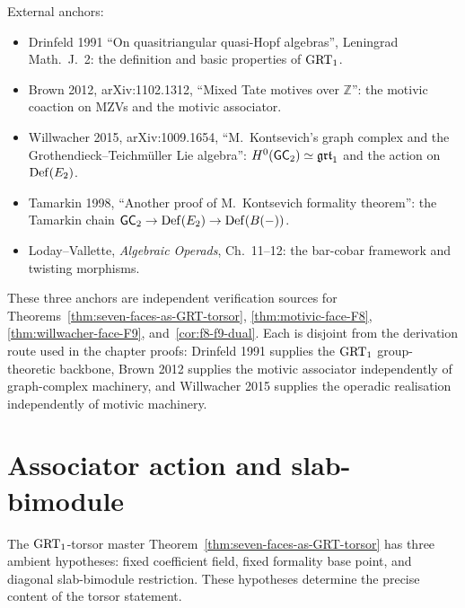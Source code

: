 External anchors:
\begin{itemize}
\item Drinfeld 1991 ``On quasitriangular quasi-Hopf algebras'',
Leningrad Math.~J.~2: the definition and basic properties of
$\mathrm{GRT}_1$.
\item Brown 2012, arXiv:1102.1312, ``Mixed Tate motives over
$\mathbb{Z}$'': the motivic coaction on MZVs and the motivic
associator.
\item Willwacher 2015, arXiv:1009.1654, ``M.~Kontsevich's graph
complex and the Grothendieck--Teichm\"uller Lie algebra'':
$H^0(\mathsf{GC}_2)\simeq\mathfrak{grt}_1$ and the action on $\mathrm{Def}(E_2)$.
\item Tamarkin 1998, ``Another proof of M.~Kontsevich formality
theorem'': the Tamarkin chain
$\mathsf{GC}_2\to\mathrm{Def}(E_2)\to\mathrm{Def}(B(-))$.
\item Loday--Vallette, \emph{Algebraic Operads}, Ch.~11--12: the
bar-cobar framework and twisting morphisms.
\end{itemize}

These three anchors are independent verification sources for
Theorems~\ref{thm:seven-faces-as-GRT-torsor},
\ref{thm:motivic-face-F8}, \ref{thm:willwacher-face-F9},
and~\ref{cor:f8-f9-dual}. Each is disjoint from the derivation
route used in the chapter proofs: Drinfeld 1991 supplies the
$\mathrm{GRT}_1$ group-theoretic backbone, Brown 2012 supplies the motivic
associator independently of graph-complex machinery, and
Willwacher 2015 supplies the operadic realisation independently of
motivic machinery.

\section{Associator action and slab-bimodule}
\label{sec:grt-qualifiers}

The $\mathrm{GRT}_1$-torsor master Theorem~\ref{thm:seven-faces-as-GRT-torsor}
has three ambient hypotheses: fixed coefficient field, fixed
formality base point, and diagonal slab-bimodule restriction. These
hypotheses determine the precise content of the torsor statement.

